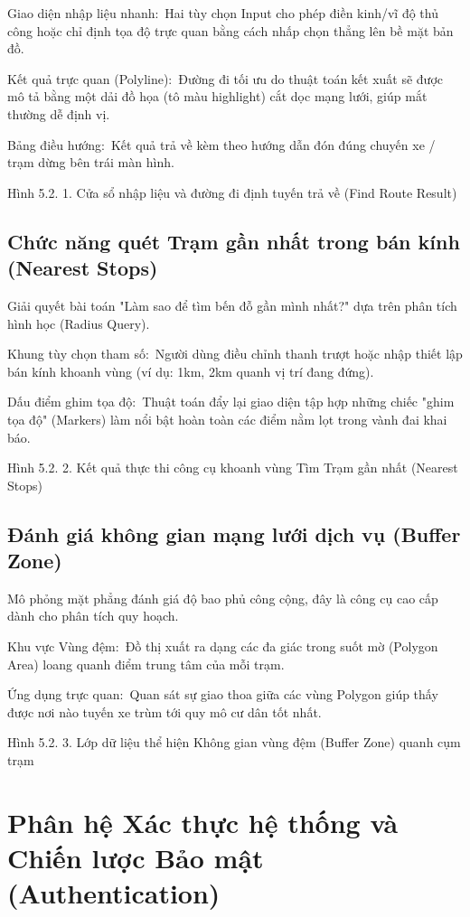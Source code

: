 \documentclass[13pt,a4paper]{report}
\begin{document}
Giao diện nhập liệu nhanh: Hai tùy chọn Input cho phép điền kinh/vĩ độ thủ công hoặc chỉ định tọa độ trực quan bằng cách nhấp chọn thẳng lên bề mặt bản đồ.

Kết quả trực quan (Polyline): Đường đi tối ưu do thuật toán kết xuất sẽ được mô tả bằng một dải đồ họa (tô màu highlight) cắt dọc mạng lưới, giúp mắt thường dễ định vị.

Bảng điều hướng: Kết quả trả về kèm theo hướng dẫn đón đúng chuyến xe / trạm dừng bên trái màn hình.

Hình 5.2. 1. Cửa sổ nhập liệu và đường đi định tuyến trả về (Find Route Result)

\subsection{Chức năng quét Trạm gần nhất trong bán kính (Nearest Stops)}

Giải quyết bài toán "Làm sao để tìm bến đỗ gần mình nhất?" dựa trên phân tích hình học (Radius Query).

Khung tùy chọn tham số: Người dùng điều chỉnh thanh trượt hoặc nhập thiết lập bán kính khoanh vùng (ví dụ: 1km, 2km quanh vị trí đang đứng).

Dấu điểm ghim tọa độ: Thuật toán đẩy lại giao diện tập hợp những chiếc "ghim tọa độ" (Markers) làm nổi bật hoàn toàn các điểm nằm lọt trong vành đai khai báo.

Hình 5.2. 2. Kết quả thực thi công cụ khoanh vùng Tìm Trạm gần nhất (Nearest Stops)

\subsection{Đánh giá không gian mạng lưới dịch vụ (Buffer Zone)}

Mô phỏng mặt phẳng đánh giá độ bao phủ công cộng, đây là công cụ cao cấp dành cho phân tích quy hoạch.

Khu vực Vùng đệm: Đồ thị xuất ra dạng các đa giác trong suốt mờ (Polygon Area) loang quanh điểm trung tâm của mỗi trạm.

Ứng dụng trực quan: Quan sát sự giao thoa giữa các vùng Polygon giúp thấy được nơi nào tuyến xe trùm tới quy mô cư dân tốt nhất.

Hình 5.2. 3. Lớp dữ liệu thể hiện Không gian vùng đệm (Buffer Zone) quanh cụm trạm

\section{Phân hệ Xác thực hệ thống và Chiến lược Bảo mật (Authentication)}
\end{document}
